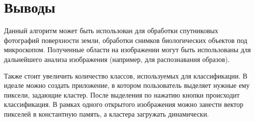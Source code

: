 \section{Выводы}
Данный алгоритм может быть использован для обработки спутниковых фотографий поверхности земли, обработки снимков биологических объектов под микроскопом.
Полученные области на изображении могут быть использованы для дальнейшего анализа изображения (например, для распознавания образов).

Также стоит увеличить количество классов, используемых для классификации. В идеале можно создать приложение,
в котором пользователь выделяет нужные ему пиксели, задающие кластер. После выделения по нажатию кнопки происходит классификация.
В рамках одного открытого изображения можно занести вектор пикселей в константную память, а кластера загружать динамически.
\pagebreak
